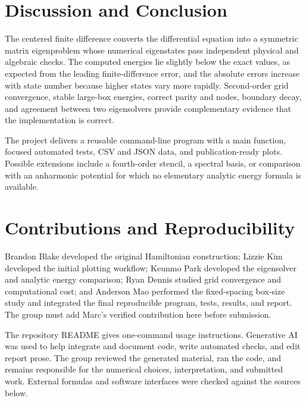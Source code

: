 \documentclass[10pt]{article}
\begin{document}
\section{Discussion and Conclusion}
The centered finite difference converts the differential equation into a
symmetric matrix eigenproblem whose numerical eigenstates pass independent
physical and algebraic checks. The computed energies lie slightly below
the exact values, as expected from the leading finite-difference error, and
the absolute errors increase with state number because higher states vary
more rapidly. Second-order grid convergence, stable large-box energies,
correct parity and nodes, boundary decay, and agreement between two
eigensolvers provide complementary evidence that the implementation is
correct.

The project delivers a reusable command-line program with a main function,
focused automated tests, CSV and JSON data, and publication-ready plots.
Possible extensions include a fourth-order stencil, a spectral basis, or
comparison with an anharmonic potential for which no elementary analytic
energy formula is available.

\section{Contributions and Reproducibility}
Brandon Blake developed the original Hamiltonian construction; Lizzie Kim
developed the initial plotting workflow; Keunmo Park developed the
eigensolver and analytic energy comparison; Ryan Dennis studied grid
convergence and computational cost; and Anderson Mao performed the
fixed-spacing box-size study and integrated the final reproducible program,
tests, results, and report. The group must add Marc's verified contribution
here before submission.

The repository README gives one-command usage instructions. Generative AI
was used to help integrate and document code, write automated checks, and
edit report prose. The group reviewed the generated material, ran the code,
and remains responsible for the numerical choices, interpretation, and
submitted work. External formulas and software interfaces were checked
against the sources below.
\end{document}
